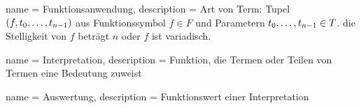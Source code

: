 

\makeglossaries

{
    name = {Funktionsanwendung},
    description = {Art von Term: Tupel $(f, {t}_{0}, \dots, {t}_{n-1})$ aus Funktionssymbol ${f \in F}$ und Parametern ${{t}_{0}, \dots, {t}_{n-1} \in T}$. die Stelligkeit von $f$ beträgt $n$ oder $f$ ist variadisch.}
}

{
    name = Interpretation,
    description = {Funktion, die Termen oder Teilen von Termen eine Bedeutung zuweist}
}

{
    name = Auswertung,
    description = {Funktionswert einer Interpretation}
}




